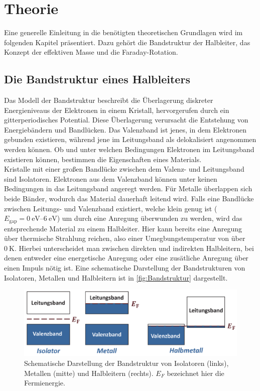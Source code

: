 \chapter{Theorie}
\label{cha:Theorie}
Eine generelle Einleitung in die benötigten theoretischen Grundlagen wird im folgenden Kapitel präsentiert. Dazu gehört
die Bandstruktur der Halbleiter, das Konzept der effektiven Masse und die Faraday-Rotation. 
\section{Die Bandstruktur eines Halbleiters}
Das Modell der Bandstruktur beschreibt die Überlagerung diskreter Energieniveaus der Elektronen in einem Kristall, hervorgerufen durch
ein gitterperiodisches Potential. Diese Überlagerung verursacht die Entstehung von Energiebändern und Bandlücken. Das Valenzband ist jenes, in dem Elektronen gebunden existieren,
während jene im Leitungsband als delokalisiert angenommen werden können. Ob und unter welchen Bedingungen Elektronen im Leitungsband existieren können,
bestimmen die Eigenschaften eines Materials.\\
Kristalle mit einer großen Bandlücke zwischen dem Valenz- und Leitungsband sind Isolatoren. Elektronen aus dem Valenzband können unter keinen Bedingungen in 
das Leitungsband angeregt werden. Für Metalle überlappen sich beide Bänder, wodurch das Material dauerhaft leitend wird. Falls eine Bandlücke zwischen 
Leitungs- und Valenzband existiert, welche klein genug ist ($E_{\text{gap}}=\qtyrange{0}{6}{\electronvolt}$) um durch eine Anregung überwunden zu werden, wird das entsprechende Material zu einem Halbleiter. 
Hier kann bereits eine Anregung über thermische Strahlung reichen, also einer Umegbungstemperatur von über $\qty{0}{\kelvin}$.
Hierbei unterscheidet man zwischen direkten und indirekten Halbleitern, bei denen entweder eine energetische Anregung oder eine zusätliche Anregung über einen 
Impuls nötig ist. Eine schematische Darstellung der Bandstrukturen von Isolatoren, Metallen und Halbleitern ist in \autoref{fig:Bandstruktur} dargestellt.
\begin{figure}
    \centering
    \includegraphics[width = \textwidth]{content/V46_pictures/Bandstruktur.png}
    \caption{Schematische Darstellung der Bandstruktur von Isolatoren (links), Metallen (mitte) und Halbleitern (rechts). $E_F$ bezeichnet hier die Fermienergie. \cite{grossmarx}}
    \label{fig:Bandstruktur}
\end{figure}
